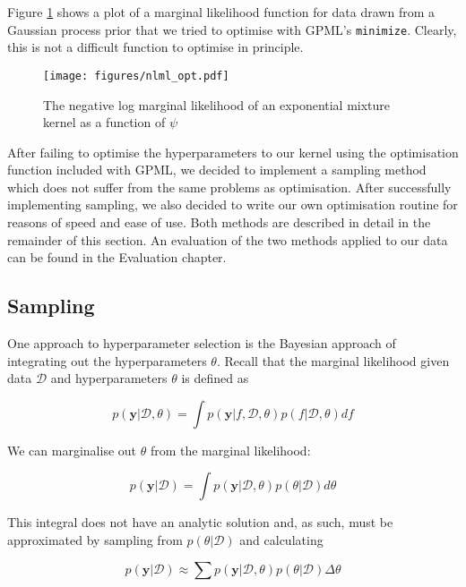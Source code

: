 \documentclass[a4paper,12pt,twoside,openright]{report}
\begin{document}
Figure \ref{nlmlopt} shows a plot of a marginal likelihood function for data drawn from a Gaussian process prior that we tried to optimise with GPML's \texttt{minimize}. Clearly, this is not a difficult function to optimise in principle.

\begin{figure}
\centering
  \centering
  \texttt{[image: figures/nlml\_opt.pdf]}
  \caption{The negative log marginal likelihood of an exponential mixture kernel as a function of $\psi$}
  \label{nlmlopt}
\end{figure}

After failing to optimise the hyperparameters to our kernel using the optimisation function included with GPML, we decided to implement a sampling method which does not suffer from the same problems as optimisation. After successfully implementing sampling, we also decided to write our own optimisation routine for reasons of speed and ease of use. Both methods are described in detail in the remainder of this section. An evaluation of the two methods applied to our data can be found in the Evaluation chapter.

\subsection{Sampling}
One approach to hyperparameter selection is the Bayesian approach of integrating out the hyperparameters $\theta$. Recall that the marginal likelihood given data $\mathcal{D}$ and hyperparameters $\theta$ is defined as

\begin{equation}
p(\mathbf{y}|\mathcal{D}, \theta) = \int p(\mathbf{y}|f, \mathcal{D}, \theta)p(f|\mathcal{D}, \theta) df
\end{equation}

We can marginalise out $\theta$ from the marginal likelihood:

\begin{equation}
p(\mathbf{y}|\mathcal{D}) = \int p(\mathbf{y}|\mathcal{D}, \theta)p(\theta|\mathcal{D}) d\theta
\end{equation}

This integral does not have an analytic solution and, as such, must be approximated by sampling from $p(\theta|\mathcal{D})$ and calculating

\begin{equation}
p(\mathbf{y}|\mathcal{D}) \approx \sum p(\mathbf{y}|\mathcal{D}, \theta)p(\theta|\mathcal{D}) \Delta\theta
\end{equation}
\end{document}
